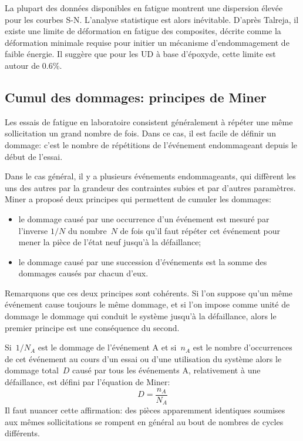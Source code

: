 \medskip
La plupart des données disponibles en fatigue montrent une dispersion élevée pour les courbes S-N. L'analyse statistique est alors inévitable.
\medskipvm
D'après Talreja, il existe une limite de déformation en fatigue des composites, décrite comme la déformation minimale requise pour initier un mécanisme d'endommagement de faible énergie. Il suggère que pour les UD à base d'époxyde, cette limite est autour de 0.6\%.


\medskip
\subsection{Cumul des dommages: principes de Miner}

\medskip
Les essais de fatigue en laboratoire consistent généralement à répéter une même sollicitation un grand nombre de fois. Dans ce cas, il est facile de définir un dommage: c'est le nombre de répétitions de l'événement endommageant depuis le début de l'essai.

Dans le cas général, il y a plusieurs événements endommageants, qui diffèrent les uns des autres par la grandeur des contraintes subies et par d'autres paramètres. Miner a proposé deux principes qui permettent de cumuler les dommages:
\begin{itemize}
  \item le dommage causé par une occurrence d'un événement est mesuré par l'inverse $1/N$ du nombre~$N$ de fois qu'il faut répéter cet événement pour mener la pièce de l'état neuf jusqu'à la défaillance;
  \item le dommage causé par une succession d'événements est la somme des dommages causés par chacun d'eux.
\end{itemize}

\medskip
Remarquons que ces deux principes sont cohérents. Si l'on suppose qu'un même événement cause toujours le même dommage, et si l'on impose comme unité de dommage le dommage qui conduit le système jusqu'à la défaillance, alors le premier principe est une conséquence du second.

Si~$1 / N_A$ est le dommage de l'événement A et si~$n_A$ est le nombre d'occurrences de cet événement au cours d'un essai ou d'une utilisation du système alors le dommage total~$D$ causé par tous les événements A, relativement à une défaillance, est défini par l'équation de Miner:
\begin{equation} D = \frac{n_A}{N_A} \end{equation}
\medskipvm
{} Il faut nuancer cette affirmation: des pièces apparemment identiques soumises aux mêmes sollicitations se rompent en général au bout de nombres de cycles différents. 


